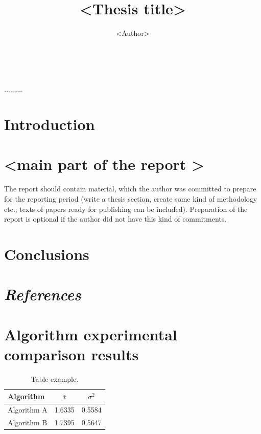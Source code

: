 \documentclass[11pt, a4paper]{article}
\date{\monthname\ \the\year}
\title{<Thesis title>}
\author{<Author>}
\begin{document}
\maketitle

.........


\tableofcontents

\section{Introduction}

\section{<main part of the report >}
The report should contain material, which the author was committed to prepare
for the reporting period (write a thesis section, create some kind of
methodology etc.; texts of papers ready for publishing can be included).
Preparation of the report is optional if the author did not have this kind of
commitments.

\section{Conclusions}

\section*{\emph{References}}%
%    

\appendix
\section{Algorithm experimental comparison results}
\begin{table}[H]
  \centering
  \caption{Table example.}
  {\begin{tabular}{|l|c|c|} \hline
    Algorithm    & $\bar{x}$ & $\sigma^{2}$ \\
    \hline
    Algorithm A  & 1.6335    & 0.5584       \\
    Algorithm B  & 1.7395    & 0.5647       \\
    \hline
  \end{tabular}}
  \label{tab:table example}
\end{table}
\end{document}
